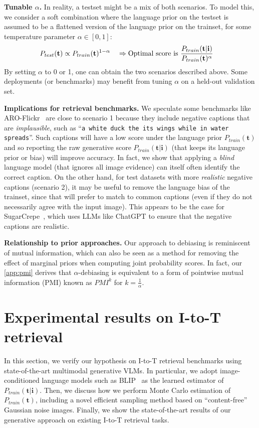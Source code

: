 \documentclass{article} \usepackage{iclr2024_conference,times}
\begin{document}
{\bf Tunable $\alpha$.} In reality, a testset might be a mix of both scenarios. To model this, we consider a soft combination where the language prior on the testset is assumed to be a flattened version of the language prior on the trainset, for some temperature parameter $\alpha \in [0,1]$:
\begin{align}
P_{test}(\mathbf{t}) \propto P_{train}(\mathbf{t})^{1-\alpha} \quad \Rightarrow \text{Optimal score is }& \frac{P_{train}(\mathbf{t}| \mathbf{i})}{P_{train}({\bf t})^{\alpha}}
\label{eq:debias_i2t}
\end{align}
By setting $\alpha$ to 0 or 1, one can obtain the two scenarios described above. Some deployments
(or benchmarks) may benefit from tuning $\alpha$ on a held-out validation set.



{\bf Implications for retrieval benchmarks.} We speculate some benchmarks like ARO-Flickr~\citep{aro} are close to scenario 1 because they include negative captions  that are {\em implausible}, such as ``{\tt a white duck the its wings while in water spreads}''. Such captions will have a low score under the language prior $P_{train}(\mathbf{t})$ and so reporting the raw generative score $P_{train}(\mathbf{t}|\mathbf{i})$ (that keeps its language prior or bias) will improve accuracy. In fact, we show that applying a {\em blind} language model (that ignores all image evidence) can itself often identify the correct caption. On the other hand, for test datasets with more {\em realistic} negative captions (scenario 2), it may be useful to remove the language bias of the trainset, since that will prefer to match to common captions (even if they do not necessarily agree with the input image). This appears to be the case for SugarCrepe~\citep{sugarcrepe}, which uses LLMs like ChatGPT to ensure that the negative captions are realistic. 

{\bf Relationship to prior approaches.} Our approach to debiasing is reminiscent of mutual information, which can also be seen as a method for removing the
effect of marginal priors when computing joint probability scores. In fact, our \autoref{app:pmi} derives that $\alpha$-debiasing is equivalent to a form of pointwise mutual information (PMI) known as $PMI^k$ for $k = \frac{1}{\alpha}$.

\section{Experimental results on I-to-T retrieval}
\label{sec:visual_gpt_score}
In this section, we verify our hypothesis on I-to-T retrieval benchmarks using state-of-the-art multimodal generative VLMs. In particular, we adopt image-conditioned language models such as BLIP~\citep{blip} as the learned estimator of $P_{train}(\mathbf{t}|\mathbf{i})$. Then, we discuss how we perform Monte Carlo estimation of $P_{train}(\mathbf{t})$, including a novel efficient sampling method based on ``content-free'' Gaussian noise images. Finally, we show the state-of-the-art results of our generative approach on existing I-to-T retrieval tasks.
\end{document}
